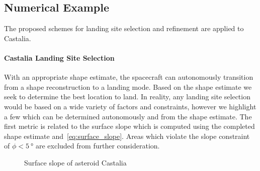 \documentclass[journal]{new-aiaa}
\begin{document}
\subsection{Numerical Example}

The proposed schemes for landing site selection and refinement are applied to Castalia.



\paragraph{Castalia Landing Site Selection}

With an appropriate shape estimate, the spacecraft can autonomously transition from a shape reconstruction to a landing mode.
Based on the shape estimate we seek to determine the best location to land. 
In reality, any landing site selection would be based on a wide variety of factors and constraints, however we highlight a few which can be determined autonomously and from the shape estimate.
The first metric is related to the surface slope which is computed using the completed shape estimate and~\cref{eq:surface_slope}.
Areas which violate the slope constraint of \( \phi < \SI{5}{\degree} \) are excluded from further consideration.
\begin{figure}[htbp]
    \centering
    \caption{Surface slope of asteroid Castalia\label{fig:surface_slope_castalia_both}}
\end{figure}
\end{document}
